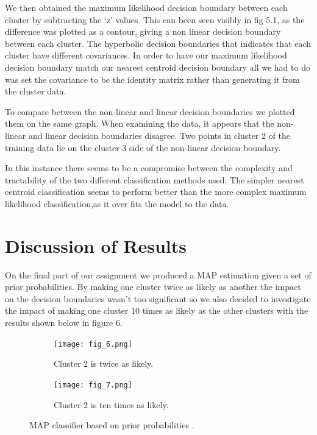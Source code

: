 \documentclass[A4Page,11pt]{article}
\begin{document}
We then obtained the maximum likelihood decision boundary between each cluster by subtracting the ‘z’ values. This can been seen visibly in fig 5.1, as the difference was plotted as a contour, giving a non linear decision boundary between each cluster. The hyperbolic decision boundaries that  indicates that each cluster have different covariances. In order to have our maximum likelihood decision boundary match our nearest centroid decision boundary all we had to do was set the covariance to be the identity matrix rather than generating it from the cluster data. \par

To compare between the non-linear and linear decision boundaries we plotted them on the same graph. When examining the data, it appears that the non-linear and linear decision boundaries disagree. Two points in cluster 2 of the training data lie on the cluster 3 side of the non-linear decision boundary. \par

In this instance there seems to be a compromise between the complexity and tractability of the two different classification methods used. The simpler nearest centroid classification seems to perform better than the more complex maximum likelihood classification,as it over fits the model to the data.

\section{Discussion of Results}
On the final part of our assignment we produced a MAP estimation given a set of prior probabilities. By making one cluster twice as likely as another the impact on the decision boundaries wasn’t too significant so we also decided to investigate the impact of making one cluster 10 times as likely as the other clusters with the results shown below in figure 6.

\begin{figure}[h!]
  \centering
  \begin{subfigure}[b]{0.45\linewidth}
    \texttt{[image: fig\_6.png]}
     \caption{Cluster 2 is twice as likely.}
  \end{subfigure}
  \begin{subfigure}[b]{0.45\linewidth}
    \texttt{[image: fig\_7.png]}
    \caption{Cluster 2 is ten times as likely.}
  \end{subfigure}
  \caption{MAP classifier based on prior probabilities .}
  \label{fig:coffee3}
\end{figure}
\end{document}
